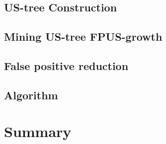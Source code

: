 \documentclass[a4paper,12pt]{book}
\begin{document}
\subsection{US-tree Construction}

\subsection{Mining US-tree FPUS-growth}

\newpage
\subsection{False positive reduction}

\newpage
\subsection{Algorithm}


\section{Summary}

\end{document}
